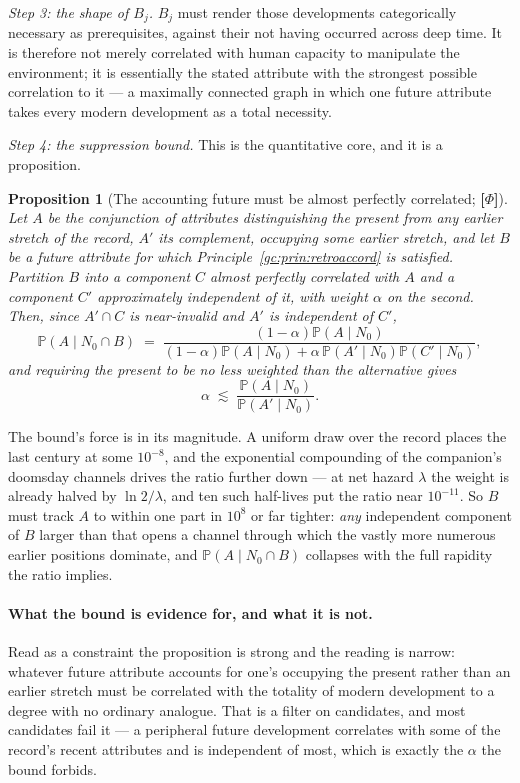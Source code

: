 \documentclass[11pt]{article}
\numberwithin{equation}{section}
\theoremstyle{plain}
\newtheorem{proposition}[theorem]{Proposition}
\theoremstyle{definition}
\theoremstyle{remark}
\newcommand{\PP}{\mathbb{P}}
\begin{document}
\emph{Step 3: the shape of $B_j$.} $B_j$ must render those developments
categorically necessary as prerequisites, against their not having
occurred across deep time. It is therefore not merely correlated with
human capacity to manipulate the environment; it is essentially the
stated attribute with the strongest possible correlation to it --- a
maximally connected graph in which one future attribute takes every
modern development as a total necessity.

\emph{Step 4: the suppression bound.} This is the quantitative core, and
it is a proposition.

\begin{proposition}[The accounting future must be almost perfectly
correlated; \textbf{[$\Phi$]}]\label{gc:prop:alpha}
Let $A$ be the conjunction of attributes distinguishing the present from
any earlier stretch of the record, $A'$ its complement, occupying some
earlier stretch, and let $B$ be a future attribute for which
Principle~\ref{gc:prin:retroaccord} is satisfied. Partition $B$ into a
component $C$ almost perfectly correlated with $A$ and a component $C'$
approximately independent of it, with weight $\alpha$ on the second.
Then, since $A'\cap C$ is near-invalid and $A'$ is independent of $C'$,
\begin{equation}\label{gc:eq:alpha}
\PP(A\mid N_0\cap B)\;=\;
\frac{(1-\alpha)\PP(A\mid N_0)}
{(1-\alpha)\PP(A\mid N_0)+\alpha\,\PP(A'\mid N_0)\PP(C'\mid N_0)},
\end{equation}
and requiring the present to be no less weighted than the alternative
gives
\begin{equation}\label{gc:eq:alphabound}
\alpha\;\lesssim\;\frac{\PP(A\mid N_0)}{\PP(A'\mid N_0)} .
\end{equation}
\end{proposition}

The bound's force is in its magnitude. A uniform draw over the record
places the last century at some $10^{-8}$, and the exponential
compounding of the companion's doomsday channels drives the ratio
further down --- at net hazard $\lambda$ the weight is already halved by
$\ln2/\lambda$, and ten such half-lives put the ratio near $10^{-11}$.
So $B$ must track $A$ to within one part in $10^{8}$ or far tighter:
\emph{any} independent component of $B$ larger than that opens a channel
through which the vastly more numerous earlier positions dominate, and
$\PP(A\mid N_0\cap B)$ collapses with the full rapidity the ratio
implies.

\paragraph{What the bound is evidence for, and what it is not.}\label{gc:rem:alphareading}
Read as a constraint the proposition is strong and the reading is
narrow: whatever future attribute accounts for one's occupying the
present rather than an earlier stretch must be correlated with the
totality of modern development to a degree with no ordinary analogue.
That is a filter on candidates, and most candidates fail it --- a
peripheral future development correlates with some of the record's
recent attributes and is independent of most, which is exactly the
$\alpha$ the bound forbids.
\end{document}
